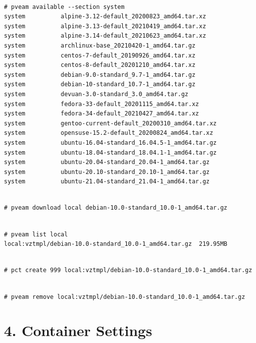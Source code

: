 \begin{lstlisting}

# pveam available --section system
system          alpine-3.12-default_20200823_amd64.tar.xz
system          alpine-3.13-default_20210419_amd64.tar.xz
system          alpine-3.14-default_20210623_amd64.tar.xz
system          archlinux-base_20210420-1_amd64.tar.gz
system          centos-7-default_20190926_amd64.tar.xz
system          centos-8-default_20201210_amd64.tar.xz
system          debian-9.0-standard_9.7-1_amd64.tar.gz
system          debian-10-standard_10.7-1_amd64.tar.gz
system          devuan-3.0-standard_3.0_amd64.tar.gz
system          fedora-33-default_20201115_amd64.tar.xz
system          fedora-34-default_20210427_amd64.tar.xz
system          gentoo-current-default_20200310_amd64.tar.xz
system          opensuse-15.2-default_20200824_amd64.tar.xz
system          ubuntu-16.04-standard_16.04.5-1_amd64.tar.gz
system          ubuntu-18.04-standard_18.04.1-1_amd64.tar.gz
system          ubuntu-20.04-standard_20.04-1_amd64.tar.gz
system          ubuntu-20.10-standard_20.10-1_amd64.tar.gz
system          ubuntu-21.04-standard_21.04-1_amd64.tar.gz

\end{lstlisting}

\begin{lstlisting}

# pveam download local debian-10.0-standard_10.0-1_amd64.tar.gz

\end{lstlisting}

\begin{lstlisting}

# pveam list local
local:vztmpl/debian-10.0-standard_10.0-1_amd64.tar.gz  219.95MB

\end{lstlisting}

\begin{lstlisting}

# pct create 999 local:vztmpl/debian-10.0-standard_10.0-1_amd64.tar.gz

\end{lstlisting}

\begin{lstlisting}

# pveam remove local:vztmpl/debian-10.0-standard_10.0-1_amd64.tar.gz

\end{lstlisting}


\section{4. Container Settings}

